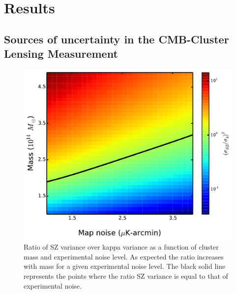 \section{Results}
\subsection{Sources of uncertainty in the CMB-Cluster Lensing Measurement}
\begin{figure}[htb]
\includegraphics[width=\linewidth]{figs/contour_plot.pdf}
\vspace{-12pt}
 \caption{
 Ratio of SZ variance over kappa variance as a function of cluster mass and experimental noise level. 
 As expected the ratio increases with mass for a given experimental noise level. 
 The black solid line represents the points where the ratio SZ variance is equal to that of experimental noise.
  }
 \label{fig:variance}
\end{figure}

